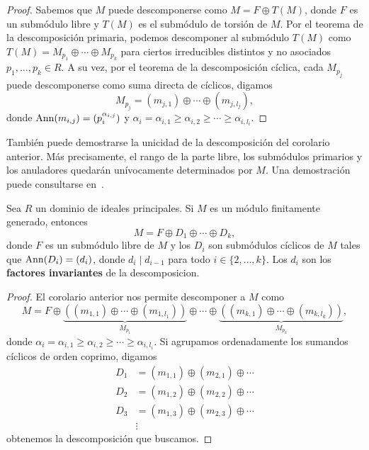 \begin{proof}
	Sabemos que $M$ puede descomponerse como $M=F\oplus T(M)$, donde $F$ es un submódulo libre y $T(M)$ es el submódulo de torsión de $M$. 
	Por el teorema de la descomposición primaria, podemos descomponer al submódulo $T(M)$ 
	como $T(M)=M_{p_1}\oplus\cdots\oplus M_{p_k}$ para ciertos irreducibles distintos y no asociados
	$p_1,\dots,p_k\in R$. A su vez, por el teorema de la descomposición cíclica, cada 
	$M_{p_j}$ puede descomponerse como suma directa de cíclicos, digamos
	\[
	M_{p_j}=(m_{j,1})\oplus\cdots\oplus (m_{j,l_j}),
	\] 
	donde $\operatorname{Ann}(m_{i,j})=(p_i^{\alpha_{i,j}})$ y $\alpha_i=\alpha_{i,1}\geq\alpha_{i,2}\geq\cdots\geq \alpha_{i,l_i}$. 
\end{proof}

También puede demostrarse la unicidad de la descomposición del corolario anterior. Más precisamente, 
el rango de la parte libre, los submódulos primarios y los anuladores quedarán unívocamente determinados
por $M$. Una demostración puede consultarse en~\cite[Theorem 6.12]{MR2344656}.

\begin{corollary}
	Sea $R$ un dominio de ideales principales. Si $M$ es un módulo finitamente generado, entonces
	\[
	M=F\oplus D_1\oplus\cdots\oplus D_k,
	\]
	donde $F$ es un submódulo libre de $M$ y los $D_i$ son submódulos
	cíclicos de $M$ tales que $\operatorname{Ann}(D_i)=(d_i)$, donde 
	$d_i\mid d_{i-1}$ para todo $i\in\{2,\dots,k\}$. Los $d_i$ son los \textbf{factores invariantes} de la descomposicion.
\end{corollary}

\begin{proof}
	El corolario anterior nos permite descomponer a $M$ como 
	\[
M=F\oplus \underbrace{\left( (m_{1,1})\oplus\cdots\oplus (m_{1,l_1})\right)}_{M_{p_1}}\oplus\cdots\oplus 
\underbrace{\left( (m_{k,1})\oplus\cdots\oplus (m_{k,l_k})\right)}_{M_{p_k}},
\]
donde $\alpha_i=\alpha_{i,1}\geq\alpha_{i,2}\geq\cdots\geq\alpha_{i,l_i}$. Si agrupamos ordenadamente 
los sumandos cíclicos
de orden coprimo, digamos
\begin{align*}
D_1 &= (m_{1,1})\oplus (m_{2,1})\oplus\cdots\\
D_2 &= (m_{1,2})\oplus (m_{2,2})\oplus\cdots\\
D_3 &= (m_{1,3})\oplus (m_{2,3})\oplus\cdots\\
&\vdots
\end{align*}
obtenemos la descomposición que buscamos. 
\end{proof}

